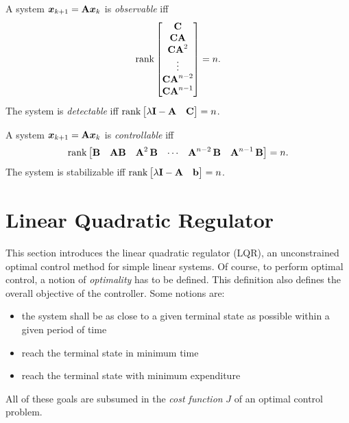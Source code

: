 			\begin{theorem}
				A system \( \bm{x}_{k + 1} = \bm{\mathrm{A}} \bm{x}_k \) is \emph{observable} iff
				\begin{equation}
					\rank
					\begin{bmatrix}
						\bm{\mathrm{C}} \\
						\bm{\mathrm{C}} \bm{\mathrm{A}} \\
						\bm{\mathrm{C}} \bm{\mathrm{A}}^2 \\
						\vdots \\
						\bm{\mathrm{C}} \bm{\mathrm{A}}^{n - 2} \\
						\bm{\mathrm{C}} \bm{\mathrm{A}}^{n - 1}
					\end{bmatrix}
					= n.
				\end{equation}
				The system is \emph{detectable} iff \( \rank \begin{bmatrix} \lambda \bm{\mathrm{I}} - \bm{\mathrm{A}} & \bm{\mathrm{C}} \end{bmatrix} = n \).
			\end{theorem}
			\begin{theorem}
				A system \( \bm{x}_{k + 1} = \bm{\mathrm{A}} \bm{x}_k \) is \emph{controllable} iff
				\begin{equation}
					\rank
					\begin{bmatrix}
						\bm{\mathrm{B}} &
						\bm{\mathrm{A}} \bm{\mathrm{B}} &
						\bm{\mathrm{A}}^2\, \bm{\mathrm{B}} &
						\cdots &
						\bm{\mathrm{A}}^{n - 2}\, \bm{\mathrm{B}} &
						\bm{\mathrm{A}}^{n - 1}\, \bm{\mathrm{B}}
					\end{bmatrix}
					= n.
				\end{equation}
				The system is stabilizable iff \( \rank \begin{bmatrix} \lambda \bm{\mathrm{I}} - \bm{\mathrm{A}} & \bm{\mathrm{b}} \end{bmatrix} = n \).
			\end{theorem}

	\section{Linear Quadratic Regulator}
		This section introduces the linear quadratic regulator (LQR), an unconstrained optimal control method for simple linear systems. Of course, to perform optimal control, a notion of \emph{optimality} has to be defined. This definition also defines the overall objective of the controller. Some notions are:
		\begin{itemize}
			\item {} the system shall be as close to a given terminal state as possible within a given period of time
			\item {} reach the terminal state in minimum time
			\item {} reach the terminal state with minimum expenditure
		\end{itemize}
		All of these goals are subsumed in the \emph{cost function} \(J\) of an optimal control problem.

